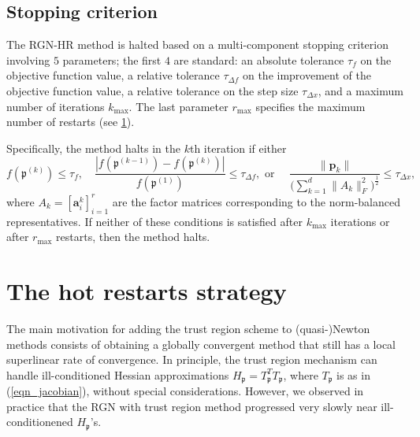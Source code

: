 \documentclass[a4paper,10pt,final]{siamart1116}
\newcommand{\tuple}[1]{\mathfrak{#1}}
\newcommand{\vect}[1]{\mathbf{#1}}
\newcommand{\sten}[3]{\vect{#1}_{#2}^{#3}}
\newcommand{\refeqn}[1]{{(\ref{#1})}}
\newcommand{\refsec}[1]{{\cref{#1}}}
\numberwithin{equation}{section}
\numberwithin{figure}{section}
\numberwithin{table}{section}
\numberwithin{theorem}{section}
\begin{document}
\subsection{Stopping criterion} \label{sec_stopping_criterion}
The RGN-HR method is halted based on a multi-com\-po\-nent stopping criterion involving $5$ parameters; the first $4$ are standard: an absolute tolerance $\tau_f$ on the objective function value, a relative tolerance $\tau_{\Delta f}$ on the improvement of the objective function value, a relative tolerance on the step size $\tau_{\Delta x}$, and a maximum number of iterations $k_{\max}$. The last parameter $r_{\max}$ specifies the maximum number of restarts (see \refsec{sec_hot_restarts}).

Specifically, the method halts in the $k$th iteration if either
\[
 f(\tuple{p}^{(k)}) \le \tau_f,
 \quad
 \frac{|f(\tuple{p}^{(k-1)})-f(\tuple{p}^{(k)})|}{f(\tuple{p}^{(1)})} \le \tau_{\Delta f},
 \text{ or }\quad
 \frac{\|\vect{p}_k\|}{ \bigl( \sum_{k=1}^d \|A_k\|^2_F \bigr)^{\frac{1}{2}}} \le \tau_{\Delta x},
\]
where $A_k = [\sten{a}{i}{k}]_{i=1}^r$ are the factor matrices corresponding to the norm-balanced representatives.
If neither of these conditions is satisfied after $k_{\max}$ iterations or after $r_{\max}$ restarts, then the method halts.

\section{The hot restarts strategy}\label{sec_hot_restarts}
The main motivation for adding the trust region scheme to (quasi-)\-Newton methods consists of obtaining a globally convergent method that still has a local superlinear rate of convergence.
In principle, the trust region mechanism can handle ill-conditioned Hessian approximations $H_{\tuple{p}} = T_{\tuple{p}}^T T_{\tuple{p}}$, where $T_{\tuple{p}}$ is as in \refeqn{eqn_jacobian}, without special considerations. However, we observed in practice that the RGN with trust region method progressed very slowly near ill-conditionened $H_{\tuple{p}}$'s.
\end{document}
